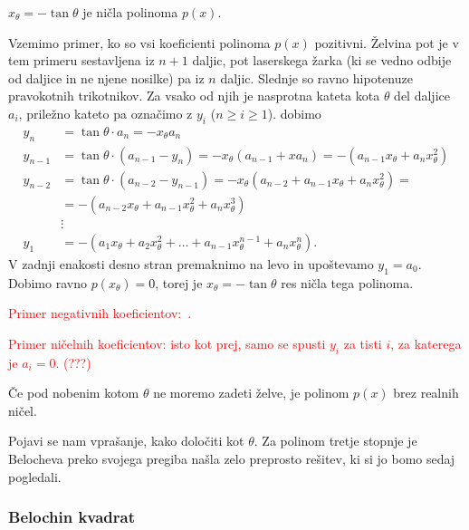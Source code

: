 \begin{trditev}
    $x_{\theta} = - \tan \theta$ je ničla polinoma $p(x)$.
\end{trditev}

\begin{dokaz}
    Vzemimo primer, ko so vsi koeficienti polinoma $p(x)$ pozitivni. Želvina pot je v tem primeru sestavljena iz $n+1$ daljic, pot laserskega žarka (ki se vedno odbije od daljice in ne njene nosilke) pa iz $n$ daljic. Slednje so ravno hipotenuze pravokotnih trikotnikov. Za vsako od njih je nasprotna kateta kota $\theta$ del daljice $a_i$, priležno kateto pa označimo z $y_i$ ($ n \geq i \geq 1$). dobimo
    \begin{align*}
        y_n &= \tan \theta \cdot a_n = - x_{\theta} a_n \\
        y_{n-1} &= \tan \theta \cdot (a_{n-1} - y_n) = - x_{\theta} (a_{n-1} + x a_n) = - (a_{n-1} x_{\theta} + a_n x_{\theta}^2)\\
        y_{n-2} &= \tan \theta \cdot (a_{n-2} - y_{n-1}) = - x_{\theta} (a_{n-2} + a_{n-1} x_{\theta} + a_n x_{\theta}^2) = \\
        &= - (a_{n-2} x_{\theta} + a_{n-1} x_{\theta}^2 + a_n x_{\theta}^3) \\
        &\vdots \\
        y_1 &= - (a_1 x_{\theta} + a_2 x_{\theta}^2 + \ldots + a_{n-1} x_{\theta}^{n-1} + a_n x_{\theta}^n).
    \end{align*}
    V zadnji enakosti desno stran premaknimo na levo in upoštevamo $y_1 = a_0$. Dobimo ravno $p(x_{\theta}) = 0$, torej je $x_{\theta} = - \tan \theta$ res ničla tega polinoma.

    \textcolor{red}{Primer negativnih koeficientov:~\cite[str.\ 36]{zore2022}.}

    \textcolor{red}{Primer ničelnih koeficientov: isto kot prej, samo se spusti $y_i$ za tisti $i$, za katerega je $a_i = 0$. (\textcolor{red}{???})}
\end{dokaz}

Če pod nobenim kotom $\theta$ ne moremo zadeti želve, je polinom $p(x)$ brez realnih ničel.

Pojavi se nam vprašanje, kako določiti kot $\theta$. Za polinom tretje stopnje je Belocheva preko svojega pregiba našla zelo preprosto rešitev, ki si jo bomo sedaj pogledali.

\subsubsection*{Belochin kvadrat}


